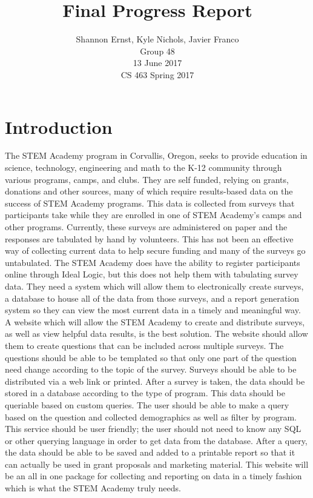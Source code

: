 \documentclass[letterpaper,10pt,serif,draftclsnofoot,onecolumn,compsoc,titlepage]{IEEEtran}
\title{Final Progress Report}
\author{Shannon Ernst, Kyle Nichols, Javier Franco\\ Group 48 \\ 13 June 2017 \\ CS 463 Spring 2017}
\begin{document}
\maketitle
\begin{abstract}

\end{abstract}
\newpage
\tableofcontents
\newpage

\section{Introduction}
The STEM Academy program in Corvallis, Oregon, seeks to provide education in science, technology, engineering and math to the K-12 community through various programs, camps, and clubs.
They are self funded, relying on grants, donations and other sources, many of which require results-based data on the success of STEM Academy programs.
This data is collected from surveys that participants take while they are enrolled in one of STEM Academy's camps and other programs.
Currently, these surveys are administered on paper and the responses are tabulated by hand by volunteers.
This has not been an effective way of collecting current data to help secure funding and many of the surveys go untabulated.
The STEM Academy does have the ability to register participants online through Ideal Logic, but this does not help them with tabulating survey data.
They need a system which will allow them to electronically create surveys, a database to house all of the data from those surveys, and a report generation system so they can view the most current data in a timely and meaningful way.\\

A website which will allow the STEM Academy to create and distribute surveys, as well as view helpful data results, is the best solution.
The website should allow them to create questions that can be included across multiple surveys.
The questions should be able to be templated so that only one part of the question need change according to the topic of the survey.
Surveys should be able to be distributed via a web link or printed.
After a survey is taken, the data should be stored in a database according to the type of program.
This data should be queriable based on custom queries.
The user should be able to make a query based on the question and collected demographics as well as filter by program.
This service should be user friendly; the user should not need to know any SQL or other querying language in order to get data from the database.
After a query, the data should be able to be saved and added to a printable report so that it can actually be used in grant proposals and marketing material.
This website will be an all in one package for collecting and reporting on data in a timely fashion which is what the STEM Academy truly needs.\\
\end{document}
